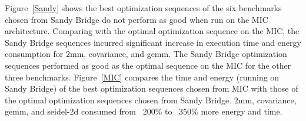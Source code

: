 Figure~\ref{Sandy} shows the best optimization sequences of the six benchmarks
chosen from Sandy Bridge do not perform as good when run on the MIC architecture. 
Comparing with the optimal optimization sequence on the MIC, the Sandy Bridge
sequences incurred significant increase in execution time and energy consumption
for 2mm, covariance, and gemm. The Sandy Bridge optimization sequences 
performed as good as the optimal sequence on the MIC for the other three benchmarks. 
Figure~\ref{MIC} compares the time and energy (running on Sandy Bridge) of 
the best optimization sequences chosen from MIC with those of the optimal optimization 
sequences chosen from Sandy Bridge. 2mm, covariance, gemm, and seidel-2d consumed
from ~200\% to ~350\% more energy and time. 

